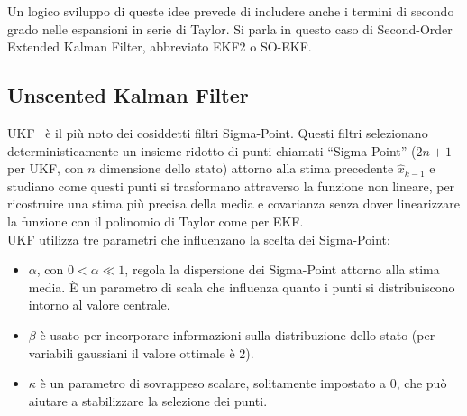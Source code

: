 \documentclass[12pt,a4paper,openright,twoside]{book}
\begin{document}
Un logico sviluppo di queste idee prevede di includere anche i termini di secondo grado nelle espansioni in serie di Taylor. Si parla in questo caso di Second-Order Extended Kalman Filter, abbreviato EKF2 o SO-EKF.

\subsection{Unscented Kalman Filter}

UKF~\cite{882463} è il più noto dei cosiddetti filtri Sigma-Point. Questi filtri selezionano deterministicamente un insieme ridotto di punti chiamati ``Sigma-Point'' ($2n+1$ per UKF, con $n$ dimensione dello stato) attorno alla stima precedente $\hat{x}_{k-1}$ e studiano come questi punti si trasformano attraverso la funzione non lineare, per ricostruire una stima più precisa della media e covarianza senza dover linearizzare la funzione con il polinomio di Taylor come per EKF. \\

UKF utilizza tre parametri che influenzano la scelta dei Sigma-Point:
\begin{itemize}
\item $\alpha$, con $0<\alpha\ll1$, regola la dispersione dei Sigma-Point attorno alla stima media. È un parametro di scala che influenza quanto i punti si distribuiscono intorno al valore centrale.
\item $\beta$ è usato per incorporare informazioni sulla distribuzione dello stato (per variabili gaussiani il valore ottimale è $2$).
\item $\kappa$ è un parametro di sovrappeso scalare, solitamente impostato a $0$, che può aiutare a stabilizzare la selezione dei punti.
\end{itemize}
\end{document}
